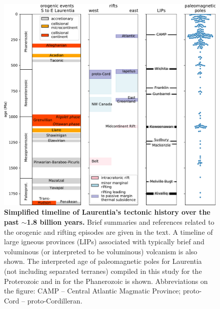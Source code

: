 \documentclass[twocolumn, switch]{article} %
\begin{document}
\begin{figure}
\centering
\includegraphics[width=\textwidth]{../Figures/Tectonic_history.pdf}
\caption{\textbf{Simplified timeline of Laurentia's tectonic history over the past $\sim$1.8 billion years.} Brief summaries and references related to the orogenic and rifting episodes are given in the text. A timeline of large igneous provinces (LIPs) associated with typically brief and voluminous (or interpreted to be voluminous) volcanism is also shown. The interpreted age of paleomagnetic poles for Laurentia (not including separated terranes) compiled in this study for the Proterozoic and in \cite{Torsvik2012a} for the Phanerozoic is shown. Abbreviations on the figure: CAMP -- Central Atlantic Magmatic Province; proto-Cord -- proto-Cordilleran.}
\label{fig:tectonic_history}
\end{figure}
\end{document}

